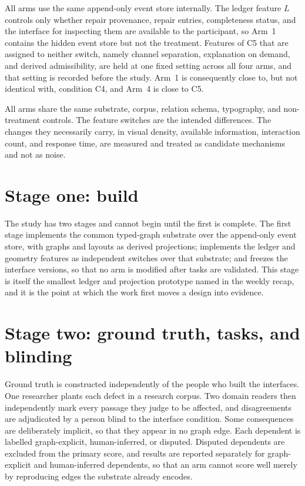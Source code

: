 \documentclass[11pt]{article}
\theoremstyle{definition}
\begin{document}
All arms use the same append-only event store internally. The ledger feature $L$ controls only whether repair provenance, repair entries, completeness status, and the interface for inspecting them are available to the participant, so Arm~1 contains the hidden event store but not the treatment. Features of C5 that are assigned to neither switch, namely channel separation, explanation on demand, and derived admissibility, are held at one fixed setting across all four arms, and that setting is recorded before the study. Arm~1 is consequently close to, but not identical with, condition C4, and Arm~4 is close to C5.

All arms share the same substrate, corpus, relation schema, typography, and non-treatment controls. The feature switches are the intended differences. The changes they necessarily carry, in visual density, available information, interaction count, and response time, are measured and treated as candidate mechanisms and not as noise.

\section{Stage one: build}

The study has two stages and cannot begin until the first is complete. The first stage implements the common typed-graph substrate over the append-only event store, with graphs and layouts as derived projections; implements the ledger and geometry features as independent switches over that substrate; and freezes the interface versions, so that no arm is modified after tasks are validated. This stage is itself the smallest ledger and projection prototype named in the weekly recap, and it is the point at which the work first moves a design into evidence.

\section{Stage two: ground truth, tasks, and blinding}

Ground truth is constructed independently of the people who built the interfaces. One researcher plants each defect in a research corpus. Two domain readers then independently mark every passage they judge to be affected, and disagreements are adjudicated by a person blind to the interface condition. Some consequences are deliberately implicit, so that they appear in no graph edge. Each dependent is labelled graph-explicit, human-inferred, or disputed. Disputed dependents are excluded from the primary score, and results are reported separately for graph-explicit and human-inferred dependents, so that an arm cannot score well merely by reproducing edges the substrate already encodes.
\end{document}
